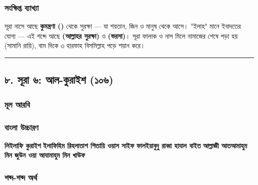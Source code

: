 \subsubsection*{সংক্ষিপ্ত ব্যাখ্যা}
সূরা নাসে আছে \textbf{কুমন্ত্রণা ()} থেকে সুরক্ষা — যা শয়তান, জিন ও মানুষ থেকে আসে। "ইলাহ" মানে ইবাদতের যোগ্য — এই শব্দে আছে \textbf{  (আল্লাহর সুরক্ষা)} ও \textbf{ (ভরসা)}। সূরা ফালাক ও নাস মিলে নামাজের শেষে পড়া হয় (সামানি রায়ি), বাম দিকে ৩ হারফাহ বিসমিল্লাহ পড়ে শয়ান করে।

\medskip\hrule\medskip

\subsection*{৮. সূরা ৬: আল-কুরাইশ (১০৬)}

\subsubsection*{মূল আরবি}
\begin{center}\end{center}
\begin{center}\end{center}
\begin{center}\end{center}
\begin{center}\end{center}

\subsubsection*{বাংলা উচ্চারণ}
\textbf{লিইলাফি কুরাইশ}
\textbf{ইলাফিহিম রিহলাতাশ শিতায়ি ওয়াস সাইফ}
\textbf{ফালইয়াবুদু রাব্বা হাযাল বাইত}
\textbf{আল্লাজী আতআমাহুম মিন জুউন ওয়া আযামাহুম মিন খাউফ}

\subsubsection*{শব্দ-শব্দ অর্থ}

